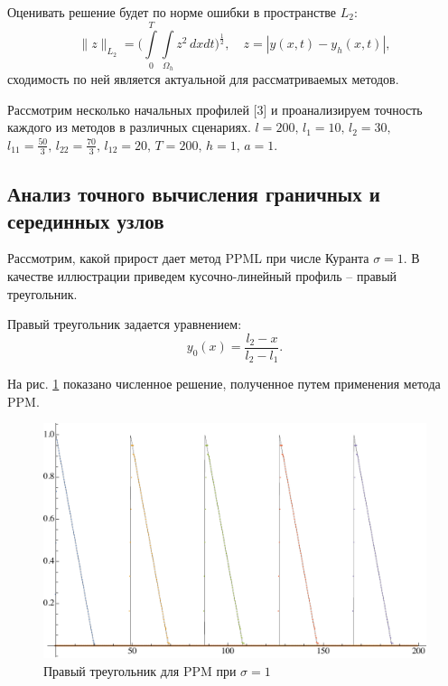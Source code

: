 \documentclass[12pt,a4paper]{article}
\newcommand{\picref}[1]{рис. \ref{#1}}
\begin{document}
    Оценивать решение будет по норме ошибки в пространстве $ L_2\colon $
    \[
        \|z\|_{L_2} = \Biggl( \int\limits_{0}^{T}\int\limits_{\Omega_h} z^2\, dx dt \Biggr)^{\tfrac{1}{2}}, \quad z = |y(x,t)-y_h(x,t)|,
    \]
    \noindent сходимость по ней является актуальной для рассматриваемых методов.

    Рассмотрим несколько начальных профилей [3] и проанализируем точность каждого из методов в различных сценариях. $ l = 200,\, l_1 = 10,\, l_2 = 30,$
    \noindent $ l_{11} = \frac{50}{3},\, l_{22} = \frac{70}{3},\, l_{12} = 20,\, T = 200,\, h = 1,\, a = 1$.

    \subsection{Анализ точного вычисления граничных и серединных узлов }

    Рассмотрим, какой прирост дает метод PPML при числе Куранта $ \sigma = 1 $. В качестве иллюстрации приведем кусочно-линейный профиль -- правый треугольник.

    \pagebreak

    Правый треугольник задается уравнением:
    \[
            y_0(x) = \dfrac{l_2 - x}{l_2 - l_1}.
    \]

    На \picref{fig:ppm_rightTriangle_1} показано численное решение, полученное путем применения метода PPM. 

     \begin{figure}[h]
        \centering
        \includegraphics[width=\textwidth]{sigma=1./advectionPPM_rightTriangle.pdf}
        \caption{Правый треугольник для PPM при $ \sigma = 1 $}
        \label{fig:ppm_rightTriangle_1}
    \end{figure}
\end{document}

